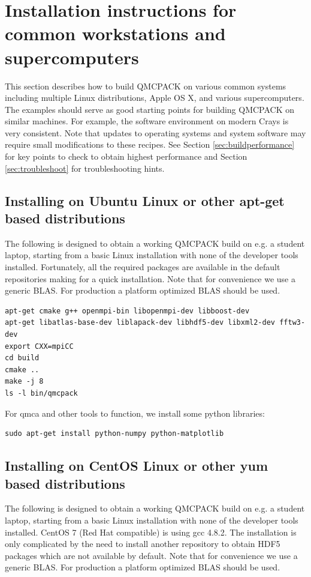 \section{Installation instructions for common workstations and
  supercomputers}
\label{sec:installexamples}

This section describes how to build QMCPACK on various common systems
including multiple Linux distributions, Apple OS X, and various
supercomputers. The examples should serve as good starting points for
building QMCPACK on similar machines. For example, the software
environment on modern Crays is very consistent. Note that updates to
operating systems and system software may require small modifications
to these recipes. See Section \ref{sec:buildperformance} for key
points to check to obtain highest performance and
Section \ref{sec:troubleshoot} for troubleshooting hints.

\subsection{Installing on Ubuntu Linux or other apt-get based distributions}
\label{sec:buildubuntu}

The following is designed to obtain a working QMCPACK build on e.g. a
student laptop, starting from a basic Linux installation with none of
the developer tools installed. Fortunately, all the required packages
are available in the default repositories making for a quick
installation. Note that for convenience we use a generic BLAS. For
production a platform optimized BLAS should be used.

\begin{verbatim}
apt-get cmake g++ openmpi-bin libopenmpi-dev libboost-dev
apt-get libatlas-base-dev liblapack-dev libhdf5-dev libxml2-dev fftw3-dev
export CXX=mpiCC
cd build
cmake ..
make -j 8
ls -l bin/qmcpack
\end{verbatim}

For qmca and other tools to function, we install some python libraries:
\begin{verbatim}
sudo apt-get install python-numpy python-matplotlib
\end{verbatim}

\subsection{Installing on CentOS Linux or other yum based distributions}

The following is designed to obtain a working QMCPACK build on e.g. a
student laptop, starting from a basic Linux installation with none of
the developer tools installed. CentOS 7 (Red Hat compatible) is using
gcc 4.8.2. The installation is only complicated by the need to install
another repository to obtain HDF5 packages which are not available by
default. Note that for convenience we use a generic BLAS. For
production a platform optimized BLAS should be used.

